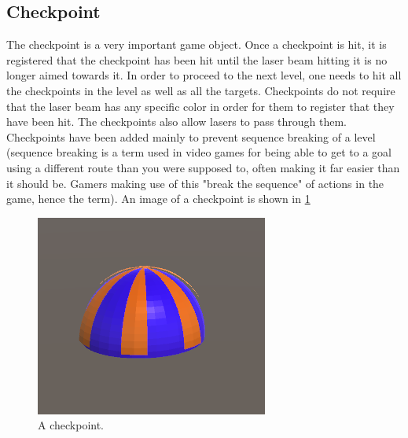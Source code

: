 		\subsection{Checkpoint}
			The checkpoint is a very important game object. Once a checkpoint is
			hit, it is registered that the checkpoint has been hit until the
			laser beam hitting it is no longer aimed towards it. In order to
			proceed to the next level, one needs to hit all the checkpoints
			in the level as well as all the targets. Checkpoints do not require
			that the laser beam has any specific color in order for them to register
			that they have been hit. The checkpoints also allow lasers to pass
			through them. Checkpoints have been added mainly to prevent sequence
			breaking of a level (sequence breaking is a term used in video games
			for being able to get to a goal using a different route than you were
			supposed to, often making it far easier than it should be. Gamers making
			use of this "break the sequence" of actions in the game, hence the term).
			An image of a checkpoint is shown in \ref{fig:checkpoint}
			\begin{figure}[!ht]
				\centering
				\includegraphics[scale = 0.5]{Checkpoint}
				\caption{A checkpoint.}
				\label{fig:checkpoint}
			\end{figure}
			
